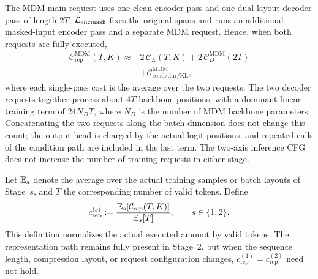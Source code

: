 The MDM main request uses one clean encoder pass and one dual-layout decoder pass of length $2T$; $\mathcal{L}_{\mathrm{encmask}}$ fixes the original spans and runs an additional masked-input encoder pass and a separate MDM request. Hence, when both requests are fully executed,
\begin{equation}
\begin{aligned}
    \mathcal C_{\mathrm{rep}}^{\mathrm{MDM}}(T,K)
    \approx{}&
    2\,\mathcal C_E(T,K)
    +2\,\mathcal C_D^{\mathrm{MDM}}(2T)\\
    &+\mathcal C_{\mathrm{cond/dur/KL}}^{\mathrm{MDM}},
\end{aligned}
\label{eq:app-cost-mdm-train}
\end{equation}
where each single-pass cost is the average over the two requests. The two decoder requests together process about $4T$ backbone positions, with a dominant linear training term of $24N_DT$, where $N_D$ is the number of MDM backbone parameters. Concatenating the two requests along the batch dimension does not change this count; the output head is charged by the actual logit positions, and repeated calls of the condition path are included in the last term. The two-axis inference CFG does not increase the number of training requests in either stage.

Let $\mathbb{E}_s$ denote the average over the actual training samples or batch layouts of Stage~$s$, and $T$ the corresponding number of valid tokens. Define
\begin{equation}
    c_{\mathrm{rep}}^{(s)}
    :=\frac{\mathbb{E}_s[\mathcal C_{\mathrm{rep}}(T,K)]}{\mathbb{E}_s[T]},
    \qquad s\in\{1,2\}.
    \label{eq:app-cost-rep-per-token}
\end{equation}
This definition normalizes the actual executed amount by valid tokens. The representation path remains fully present in Stage~2, but when the sequence length, compression layout, or request configuration changes, $c_{\mathrm{rep}}^{(1)}=c_{\mathrm{rep}}^{(2)}$ need not hold.


